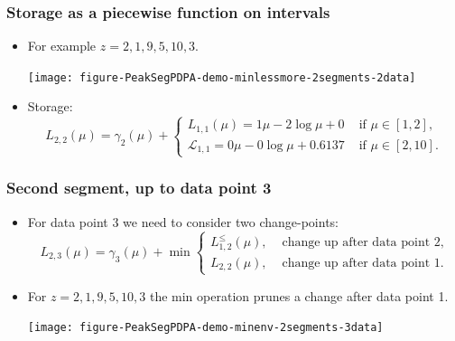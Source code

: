 \documentclass{beamer}
\begin{document}
\begin{frame}
  \frametitle{Storage as a piecewise function on intervals}
  \begin{itemize}
  \item For example $z = 2, 1, 9, 5, 10, 3$.
    \begin{center}
      \texttt{[image: figure-PeakSegPDPA-demo-minlessmore-2segments-2data]}
    \end{center}
  \item Storage: 
    \begin{equation*}
      L_{2,2}(\mu) = \gamma_2(\mu) + 
      \begin{cases}
        L_{1,1}(\mu) = 1\mu - 2\log \mu + 0 & \text{ if } \mu\in[1,2],\\
        \mathcal L_{1,1} = 0\mu -0\log\mu + 0.6137 & \text{ if } \mu\in[2,10].
      \end{cases}
    \end{equation*}
  \end{itemize}
\end{frame}

 
\begin{frame}[fragile]
  \frametitle{Second segment, up to data point 3}
  \begin{itemize}
  \item For data point 3 we need to consider two change-points:
    \begin{equation*}
      L_{2,3}(\mu) =  \gamma_3(\mu) + \min
      \begin{cases}
        L_{1,2}^{\leq}(\mu), & \text{ change up after data point 2},\\
        L_{2,2}(\mu), & \text{ change up after data point 1}. 
      \end{cases}
    \end{equation*}
  \item For $z = 2, 1, 9, 5, 10, 3$ the min operation prunes a
    change after data point 1.
    \begin{center}
      \texttt{[image: figure-PeakSegPDPA-demo-minenv-2segments-3data]}
    \end{center}
  \end{itemize}
\end{frame}
\end{document}
